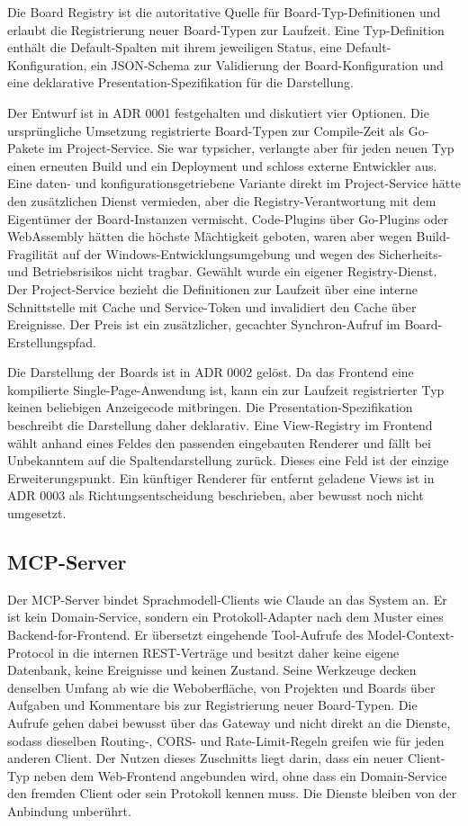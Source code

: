 Die Board Registry ist die autoritative Quelle für Board-Typ-Definitionen und erlaubt die Registrierung neuer Board-Typen zur Laufzeit. Eine Typ-Definition enthält die Default-Spalten mit ihrem jeweiligen Status, eine Default-Konfiguration, ein JSON-Schema zur Validierung der Board-Konfiguration und eine deklarative Presentation-Spezifikation für die Darstellung.

Der Entwurf ist in ADR 0001 festgehalten und diskutiert vier Optionen. Die ursprüngliche Umsetzung registrierte Board-Typen zur Compile-Zeit als Go-Pakete im Project-Service. Sie war typsicher, verlangte aber für jeden neuen Typ einen erneuten Build und ein Deployment und schloss externe Entwickler aus. Eine daten- und konfigurationsgetriebene Variante direkt im Project-Service hätte den zusätzlichen Dienst vermieden, aber die Registry-Verantwortung mit dem Eigentümer der Board-Instanzen vermischt. Code-Plugins über Go-Plugins oder WebAssembly hätten die höchste Mächtigkeit geboten, waren aber wegen Build-Fragilität auf der Windows-Entwicklungsumgebung und wegen des Sicherheits- und Betriebsrisikos nicht tragbar. Gewählt wurde ein eigener Registry-Dienst. Der Project-Service bezieht die Definitionen zur Laufzeit über eine interne Schnittstelle mit Cache und Service-Token und invalidiert den Cache über Ereignisse. Der Preis ist ein zusätzlicher, gecachter Synchron-Aufruf im Board-Erstellungspfad.

Die Darstellung der Boards ist in ADR 0002 gelöst. Da das Frontend eine kompilierte Single-Page-Anwendung ist, kann ein zur Laufzeit registrierter Typ keinen beliebigen Anzeigecode mitbringen. Die Presentation-Spezifikation beschreibt die Darstellung daher deklarativ. Eine View-Registry im Frontend wählt anhand eines Feldes den passenden eingebauten Renderer und fällt bei Unbekanntem auf die Spaltendarstellung zurück. Dieses eine Feld ist der einzige Erweiterungspunkt. Ein künftiger Renderer für entfernt geladene Views ist in ADR 0003 als Richtungsentscheidung beschrieben, aber bewusst noch nicht umgesetzt.

\subsection{MCP-Server}
\label{sub:mcp}

Der MCP-Server bindet Sprachmodell-Clients wie Claude an das System an. Er ist kein Domain-Service, sondern ein Protokoll-Adapter nach dem Muster eines Backend-for-Frontend. Er übersetzt eingehende Tool-Aufrufe des Model-Context-Protocol \cite{mcp} in die internen REST-Verträge und besitzt daher keine eigene Datenbank, keine Ereignisse und keinen Zustand. Seine Werkzeuge decken denselben Umfang ab wie die Weboberfläche, von Projekten und Boards über Aufgaben und Kommentare bis zur Registrierung neuer Board-Typen. Die Aufrufe gehen dabei bewusst über das Gateway und nicht direkt an die Dienste, sodass dieselben Routing-, CORS- und Rate-Limit-Regeln greifen wie für jeden anderen Client. Der Nutzen dieses Zuschnitts liegt darin, dass ein neuer Client-Typ neben dem Web-Frontend angebunden wird, ohne dass ein Domain-Service den fremden Client oder sein Protokoll kennen muss. Die Dienste bleiben von der Anbindung unberührt.

